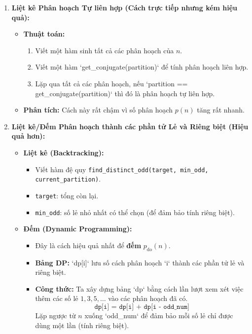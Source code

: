\documentclass[a4paper,12pt]{article}
\begin{document}
\begin{enumerate}
    \item \textbf{Liệt kê Phân hoạch Tự liên hợp (Cách trực tiếp nhưng kém hiệu quả):}
    \begin{itemize}
        \item \textbf{Thuật toán:}
        \begin{enumerate}
            \item Viết một hàm sinh tất cả các phân hoạch của $n$.
            \item Viết một hàm `get_conjugate(partition)` để tính phân hoạch liên hợp.
            \item Lặp qua tất cả các phân hoạch, nếu `partition == get_conjugate(partition)` thì đó là phân hoạch tự liên hợp.
        \end{enumerate}
        \item \textbf{Phân tích:} Cách này rất chậm vì số phân hoạch $p(n)$ tăng rất nhanh.
    \end{itemize}
    \item \textbf{Liệt kê/Đếm Phân hoạch thành các phần tử Lẻ và Riêng biệt (Hiệu quả hơn):}
    \begin{itemize}
        \item \textbf{Liệt kê (Backtracking):}
        \begin{itemize}
            \item Viết hàm đệ quy \texttt{find\_distinct\_odd(target, min\_odd, current\_partition)}.
            \item \texttt{target}: tổng còn lại.
            \item \texttt{min\_odd}: số lẻ nhỏ nhất có thể chọn (để đảm bảo tính riêng biệt).
        \end{itemize}
        \item \textbf{Đếm (Dynamic Programming):}
        \begin{itemize}
            \item Đây là cách hiệu quả nhất để \textbf{đếm} $p_{\text{do}}(n)$.
            \item \textbf{Bảng DP:} `dp[i]` lưu số cách phân hoạch `i` thành các phần tử lẻ và riêng biệt.
            \item \textbf{Công thức:} Ta xây dựng bảng `dp` bằng cách lần lượt xem xét việc thêm các số lẻ $1, 3, 5, \dots$ vào các phân hoạch đã có.
            \[ \texttt{dp[i] = dp[i] + dp[i - odd\_num]} \]
            Lặp ngược từ $n$ xuống `odd_num` để đảm bảo mỗi số lẻ chỉ được dùng một lần (tính riêng biệt).
        \end{itemize}
    \end{itemize}
\end{enumerate}
\end{document}
